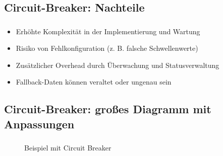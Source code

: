 \subsection{Circuit-Breaker: Nachteile}
\begin{frame}
    \frametitle{\insertsection}
    \framesubtitle{\insertsubsection}

    \begin{itemize}
        \item Erhöhte Komplexität in der Implementierung und Wartung
        \item Risiko von Fehlkonfiguration (z. B. falsche Schwellenwerte)
        \item Zusätzlicher Overhead durch Überwachung und Statusverwaltung
        \item Fallback-Daten können veraltet oder ungenau sein
    \end{itemize}
\end{frame}

\subsection{Circuit-Breaker: großes Diagramm mit Anpassungen}
\begin{frame}
    \frametitle{\insertsection}
    \framesubtitle{\insertsubsection}

    \vspace*{-14pt}
    \begin{figure}[h]
        \centering
		\resizebox{!}{.7\textheight}{%
			
		}
		\captionsetup{aboveskip=2pt}
        \caption{Beispiel mit Circuit Breaker}
    \end{figure}
\end{frame}



